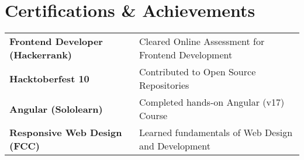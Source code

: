 \documentclass[a4paper,10pt]{article}
\begin{document}
\section{Certifications \& Achievements}




\begin{tabularx}{\linewidth}{@{}l X@{}}
\textbf{Frontend Developer (Hackerrank)} &  \normalsize{Cleared Online Assessment for Frontend Development}\\
\textbf{Hacktoberfest 10}  &  \normalsize{Contributed to Open Source Repositories }\\
\textbf{Angular (Sololearn)} &  \normalsize{Completed hands-on Angular (v17) Course}\\
\textbf{Responsive Web Design (FCC)}  &  \normalsize{Learned fundamentals of Web Design and Development}\\
\end{tabularx}

\end{document}

